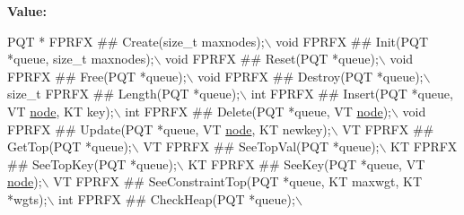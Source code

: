{\bfseries Value\+:}
\begin{DoxyCode}
PQT *  FPRFX ## Create(\textcolor{keywordtype}{size\_t} maxnodes);\(\backslash\)
  void   FPRFX ## Init(PQT *queue, \textcolor{keywordtype}{size\_t} maxnodes);\(\backslash\)
  void   FPRFX ## Reset(PQT *queue);\(\backslash\)
  void   FPRFX ## Free(PQT *queue);\(\backslash\)
  void   FPRFX ## Destroy(PQT *queue);\(\backslash\)
  size\_t FPRFX ## Length(PQT *queue);\(\backslash\)
  int    FPRFX ## Insert(PQT *queue, VT \hyperlink{a00611_adf51fe9945b6ca147057cc27ff639d0f}{node}, KT key);\(\backslash\)
  int    FPRFX ## Delete(PQT *queue, VT \hyperlink{a00611_adf51fe9945b6ca147057cc27ff639d0f}{node});\(\backslash\)
  void   FPRFX ## Update(PQT *queue, VT \hyperlink{a00611_adf51fe9945b6ca147057cc27ff639d0f}{node}, KT newkey);\(\backslash\)
  VT     FPRFX ## GetTop(PQT *queue);\(\backslash\)
  VT     FPRFX ## SeeTopVal(PQT *queue);\(\backslash\)
  KT     FPRFX ## SeeTopKey(PQT *queue);\(\backslash\)
  KT     FPRFX ## SeeKey(PQT *queue, VT \hyperlink{a00611_adf51fe9945b6ca147057cc27ff639d0f}{node});\(\backslash\)
  VT     FPRFX ## SeeConstraintTop(PQT *queue, KT maxwgt, KT *wgts);\(\backslash\)
  int    FPRFX ## CheckHeap(PQT *queue);\(\backslash\)
\end{DoxyCode}
